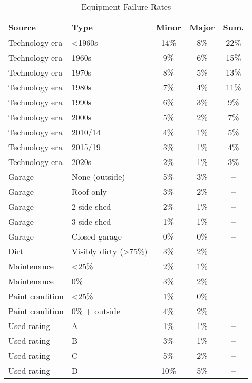 \documentclass[a4paper,10pt]{article}
\begin{document}
\begin{table}
\begin{center}
  \caption{Equipment Failure Rates}
  \begin{tabular}{llccc}
    \toprule
    Source          & Type                  & Minor  & Major & Sum. \\
    \midrule
    Technology era  & <1960s                & 14\%   & 8\%   & 22\% \\
    Technology era  & 1960s                 &  9\%   & 6\%   & 15\% \\
    Technology era  & 1970s                 &  8\%   & 5\%   & 13\% \\
    Technology era  & 1980s                 &  7\%   & 4\%   & 11\% \\
    Technology era  & 1990s                 &  6\%   & 3\%   & 9\%  \\
    Technology era  & 2000s                 &  5\%   & 2\%   & 7\%  \\
    Technology era  & 2010/14               &  4\%   & 1\%   & 5\%  \\
    Technology era  & 2015/19               &  3\%   & 1\%   & 4\%  \\
    Technology era  & 2020s                 &  2\%   & 1\%   & 3\%  \\
    Garage          & None (outside)        &  5\%   & 3\%   & --   \\
    Garage          & Roof only             &  3\%   & 2\%   & --   \\
    Garage          & 2 side shed           &  2\%   & 1\%   & --   \\
    Garage          & 3 side shed           &  1\%   & 1\%   & --   \\
    Garage          & Closed garage         &  0\%   & 0\%   & --   \\
    Dirt            & Visibly dirty (>75\%) &  3\%   & 2\%   & --   \\
    Maintenance     & <25\%                 &  2\%   & 1\%   & --   \\
    Maintenance     & 0\%                   &  3\%   & 2\%   & --   \\
    Paint condition & <25\%                 &  1\%   & 0\%   & --   \\
    Paint condition & 0\% + outside         &  4\%   & 2\%   & --   \\
    Used rating     & A                     &  1\%   & 1\%   & --   \\
    Used rating     & B                     &  3\%   & 1\%   & --   \\
    Used rating     & C                     &  5\%   & 2\%   & --   \\
    Used rating     & D                     & 10\%   & 5\%   & --   \\
    \bottomrule
  \end{tabular}
  \label{tab:equipmentFailRates}
\end{center}
\end{table}
\end{document}
